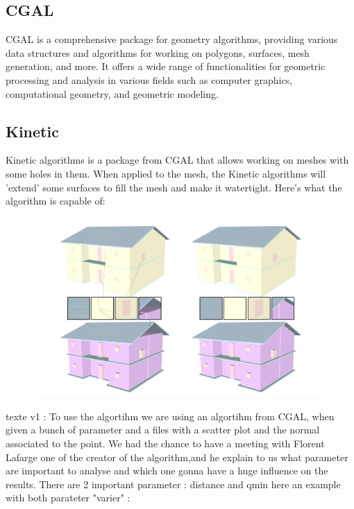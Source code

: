 \documentclass{article}
\begin{document}
\subsection{CGAL}
CGAL is a comprehensive package for geometry algorithms, providing various data structures and algorithms for working on polygons, surfaces, mesh generation, and more.
It offers a wide range of functionalities for geometric processing and analysis in various fields such as computer graphics, computational geometry, and geometric modeling.


\subsection{Kinetic}

Kinetic algorithms is a package from CGAL that allows working on meshes with some holes in them. When applied to the mesh, the Kinetic algorithms will 'extend' some surfaces to fill the mesh and make it watertight. 
Here's what the algorithm is capable of:

\begin{figure}[h]
    
\includegraphics[scale =   0.3 ]{../images/example_algorithm.png}



\end{figure}

texte v1 : 
To use the algortihm we are using an algortihm from CGAL, when given a bunch of parameter and a files with a scatter plot and the normal associated to the point.
We had the chance to have a meeting with Florent Lafarge one of the creator of the algorithm,and he explain to us what parameter are important to analyse 
and which one gonna have a huge influence on the results.
There are 2 important parameter : distance and qmin here an example with both parateter "varier" :
\end{document}
